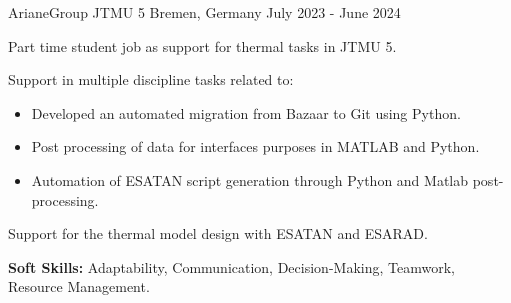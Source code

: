 

\begin{cventries}
  {ArianeGroup JTMU 5}
  {Bremen, Germany}
  {July 2023 - June 2024}
  {
    \begin{cvitems}
      \item Part time student job as support for thermal tasks in JTMU
      5.
      \item Support in multiple discipline tasks related to:
      \begin{itemize}
        \item[\checkmark] Developed an automated migration from
        Bazaar to Git using Python.
        \item[\checkmark] Post processing of data for interfaces
        purposes in MATLAB and Python.
        \item[\checkmark] Automation of ESATAN script generation
        through Python and Matlab post-processing.
      \end{itemize}
      \item Support for the thermal model design with ESATAN and
      ESARAD.
      \item \textbf{Soft Skills:} Adaptability, Communication,
      Decision-Making, Teamwork, Resource Management.
    \end{cvitems}
  }


\end{cventries}
